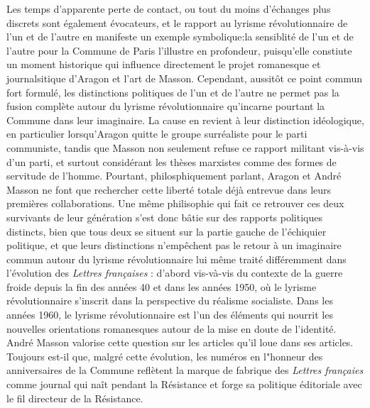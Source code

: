 Les temps d'apparente perte de contact, ou tout du moins d'échanges plus discrets sont également évocateurs, et le rapport au lyrisme révolutionnaire de l'un et de l'autre en manifeste un exemple symbolique:la sensiblité de l'un et de l'autre pour la Commune de Paris l'illustre en profondeur, puisqu'elle constiute un moment historique qui influence directement le projet romanesque et journalsitique d'Aragon et l'art de Masson. Cependant, aussitôt ce point commun fort formulé, les distinctions politiques de l'un et de l'autre ne permet pas la fusion complète autour du lyrisme révolutionnaire qu'incarne pourtant la Commune dans leur imaginaire. La cause en revient à leur distinction idéologique, en particulier lorsqu'Aragon quitte le groupe surréaliste pour le parti communiste, tandis que Masson non seulement refuse ce rapport militant vis-à-vis d'un parti, et surtout considérant les thèses marxistes comme des formes de servitude de l'homme. Pourtant, philosphiquement parlant, Aragon et André Masson ne font que rechercher cette liberté totale déjà entrevue dans leurs premières collaborations. Une même philisophie qui fait ce retrouver ces deux survivants de leur génération s'est donc bâtie sur des rapports politiques distincts, bien que tous deux se situent sur la partie gauche de l'échiquier politique, et que leurs distinctions n'empêchent pas le retour à un imaginaire commun autour du lyrisme révolutionnaire lui même traité différemment dans l'évolution des \emph{Lettres françaises} : d'abord vis-và-vis du contexte de la guerre froide depuis la fin des années 40 et dans les années 1950, où le lyrisme révolutionnaire s'inscrit dans la perspective du réalisme socialiste. Dans les années 1960, le lyrisme révolutionnaire est l'un des éléments qui nourrit les nouvelles orientations romanesques autour de la mise en doute de l'identité. André Masson valorise cette question sur les articles qu'il loue dans ses articles. Toujours est-il que, malgré cette évolution, les numéros en l"honneur des anniversaires de la Commune reflètent la marque de fabrique des \emph{Lettres françaies} comme journal qui naît pendant la Résistance et forge sa politique éditoriale avec le fil directeur de la Résistance. 
